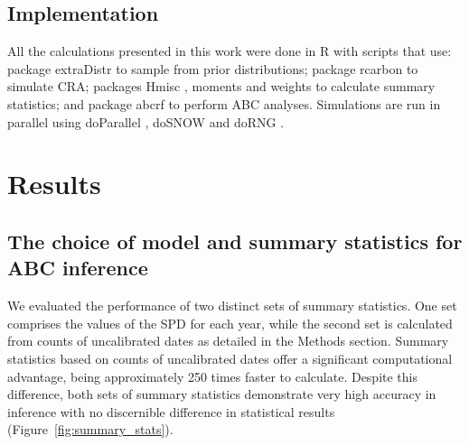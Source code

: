 \documentclass[a4paper]{article}
\begin{document}




\subsection*{Implementation}


All the calculations presented in this work were done in R \parencite{R2021} with scripts \parencite[available in][]{Navascues2023} that use: package {extraDistr} \parencite{Wolodzko2020} to sample from prior distributions; package {rcarbon} \parencite{Crema2021a} to simulate CRA; packages {Hmisc} \parencite{Harrell2022}, {moments} \parencite{Komsta2022} and {weights} \parencite{Pasek2021}
to calculate summary statistics; and package {abcrf} \parencite{Marin2022} to perform ABC analyses. Simulations are run in parallel using  {doParallel} \parencite{Microsoft2022a}, {doSNOW} \parencite{Microsoft2022b} and {doRNG} \parencite{Gaujoux2023}.
\\


\section*{\centering Results}

\subsection*{The choice of model and summary statistics for ABC inference}

We evaluated the performance of two distinct sets of summary statistics. One set comprises the values of the SPD for each year, while the second set is calculated from counts of uncalibrated dates as detailed in the Methods section. Summary statistics based on counts of uncalibrated dates offer a significant computational advantage, being approximately 250 times faster to calculate. Despite this difference, both sets of summary statistics demonstrate very high accuracy in inference with no discernible difference in statistical results  (Figure~\ref{fig:summary_stats}).
\\
\end{document}
